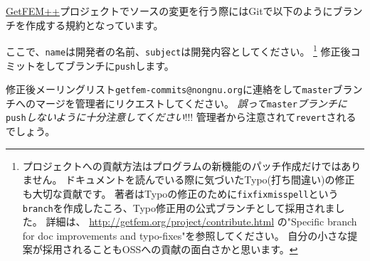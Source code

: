 \documentclass{../../style/ltjoc}
\begin{document}
\href{http://getfem.org}{GetFEM++}プロジェクトでソースの変更を行う際にはGitで以下のようにブランチを作成する規約となっています。
\begin{shbox}
\end{shbox}
ここで、\texttt{name}は開発者の名前、\texttt{subject}は開発内容としてください。
\footnote{
プロジェクトへの貢献方法はプログラムの新機能のパッチ作成だけではありません。
ドキュメントを読んでいる際に気づいたTypo(打ち間違い)の修正も大切な貢献です。
著者はTypoの修正のために\texttt{fixfixmisspell}という\texttt{branch}を作成したころ、Typo修正用の公式ブランチとして採用されました。
詳細は、 \href{http://getfem.org/project/contribute.html}{http://getfem.org/project/contribute.html} の"Specific branch for doc improvements and typo-fixes"を参照してください。
自分の小さな提案が採用されることもOSSへの貢献の面白さかと思います。
}
修正後コミットをしてブランチに\texttt{push}します。
\begin{shbox}
\end{shbox}
修正後メーリングリスト\texttt{getfem-commits@nongnu.org}に連絡をして\texttt{master}ブランチへのマージを管理者にリクエストしてください。
\emph{誤って}\texttt{master}\emph{ブランチに}\texttt{push}\emph{しないように十分注意してください}!!!
管理者から注意されて\texttt{revert}されるでしょう。
\end{document}
